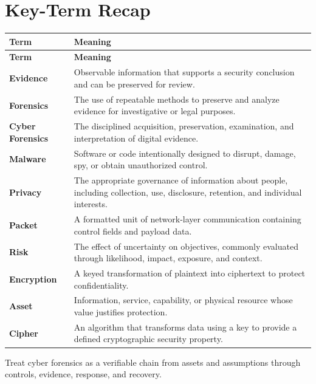 \documentclass[11pt]{article}
\begin{document}
\section*{Key-Term Recap}
\begin{longtable}{>{\RaggedRight\arraybackslash}p{}>{\RaggedRight\arraybackslash}p{}}
\toprule\rowcolor{Navy}\color{white}\textbf{Term} & \color{white}\textbf{Meaning}\\\midrule
\endfirsthead
\toprule\rowcolor{Navy}\color{white}\textbf{Term} & \color{white}\textbf{Meaning}\\\midrule
\endhead
\textbf{Evidence} & Observable information that supports a security conclusion and can be preserved for review. \\\midrule
\textbf{Forensics} & The use of repeatable methods to preserve and analyze evidence for investigative or legal purposes. \\\midrule
\textbf{Cyber Forensics} & The disciplined acquisition, preservation, examination, and interpretation of digital evidence. \\\midrule
\textbf{Malware} & Software or code intentionally designed to disrupt, damage, spy, or obtain unauthorized control. \\\midrule
\textbf{Privacy} & The appropriate governance of information about people, including collection, use, disclosure, retention, and individual interests. \\\midrule
\textbf{Packet} & A formatted unit of network-layer communication containing control fields and payload data. \\\midrule
\textbf{Risk} & The effect of uncertainty on objectives, commonly evaluated through likelihood, impact, exposure, and context. \\\midrule
\textbf{Encryption} & A keyed transformation of plaintext into ciphertext to protect confidentiality. \\\midrule
\textbf{Asset} & Information, service, capability, or physical resource whose value justifies protection. \\\midrule
\textbf{Cipher} & An algorithm that transforms data using a key to provide a defined cryptographic security property. \\\midrule
\bottomrule
\end{longtable}
\begin{takeawaybox}
Treat cyber forensics as a verifiable chain from assets and assumptions through controls, evidence, response, and recovery.
\end{takeawaybox}
\end{document}

